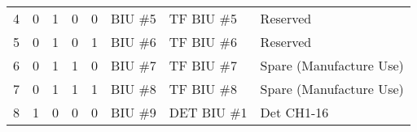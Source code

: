 \documentclass[]{article}
\begin{document}
\begin{table}[ht]
\begin{tabular}{llllllll}
			4            & 0              & 1              & 0              & 0              & BIU \#5                              & TF BIU \#5                            & Reserved                                                                                                                                                                                                                                                                                                                                                                         \\
			5            & 0              & 1              & 0              & 1              & BIU \#6                              & TF BIU \#6                            & Reserved                                                                                                                                                                                                                                                                                                                                                                         \\
			6            & 0              & 1              & 1              & 0              & BIU \#7                              & TF BIU \#7                            & Spare (Manufacture Use)                                                                                                                                                                                                                                                                                                                                                          \\
			7            & 0              & 1              & 1              & 1              & BIU \#8                              & TF BIU \#8                            & Spare (Manufacture Use)                                                                                                                                                                                                                                                                                                                                                          \\
			\rowcolor[HTML]{EFEFEF} 
			8            & 1              & 0              & 0              & 0              & BIU \#9                              & DET BIU \#1                           & \cellcolor[HTML]{EFEFEF}Det CH1-16                                                                                                                                                                                                                                                                                                                                               \\

\end{tabular}
\end{table}
\end{document}
